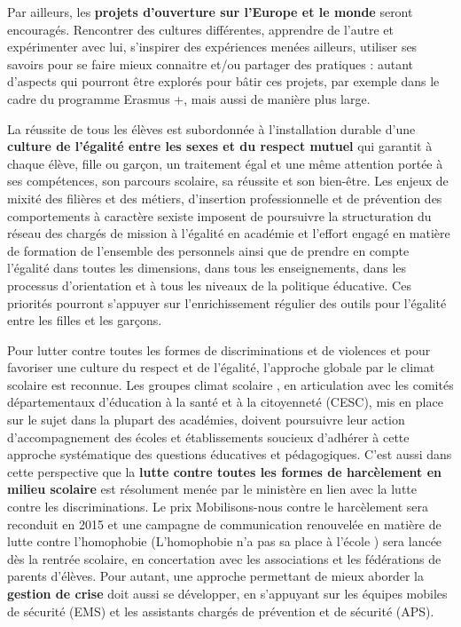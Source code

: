 Par ailleurs, les \textbf{projets d’ouverture sur l’Europe et le monde} seront encouragés. Rencontrer des cultures différentes, apprendre de l’autre et expérimenter avec lui, s’inspirer des expériences menées ailleurs, utiliser ses savoirs pour se faire mieux connaitre et/ou partager des pratiques : autant d’aspects qui pourront être explorés pour bâtir ces projets, par exemple dans le cadre du programme Erasmus +, mais aussi de manière plus large.

La réussite de tous les élèves est subordonnée à l’installation durable d’une \textbf{culture de l’égalité entre les sexes et du respect mutuel} qui garantit à chaque élève, fille ou garçon, un traitement égal et une même attention portée à ses compétences, son parcours scolaire, sa réussite et son bien-être. Les enjeux de mixité des filières et des métiers, d’insertion professionnelle et de prévention des comportements à caractère sexiste imposent de poursuivre la structuration du réseau des chargés de mission à l’égalité en académie et l’effort engagé en matière de formation de l’ensemble des personnels ainsi que de prendre en compte l’égalité dans toutes les dimensions, dans tous les enseignements, dans les processus d’orientation et à tous les niveaux de la politique éducative. Ces priorités pourront s’appuyer sur l’enrichissement régulier des outils pour l’égalité entre les filles et les garçons.

Pour lutter contre toutes les formes de discriminations et de violences et pour favoriser une culture du respect et de l’égalité, l’approche globale par le climat scolaire est reconnue. Les groupes \og climat scolaire \fg{}, en articulation avec les comités départementaux d’éducation à la santé et à la citoyenneté (CESC), mis en place sur le sujet dans la plupart des académies, doivent poursuivre leur action d’accompagnement des écoles et établissements soucieux d’adhérer à cette approche systématique des questions éducatives et pédagogiques. C’est aussi dans cette perspective que la \textbf{lutte contre toutes les formes de harcèlement en milieu scolaire} est résolument menée par le ministère en lien avec la lutte contre les discriminations. Le prix \og Mobilisons-nous contre le harcèlement \fg{} sera reconduit en 2015 et une campagne de communication renouvelée en matière de lutte contre l’homophobie (\og L’homophobie n’a pas sa place à l’école \fg{}) sera lancée dès la rentrée scolaire, en concertation avec les associations et les fédérations de parents d’élèves. Pour autant, une approche permettant de mieux aborder la \textbf{gestion de crise} doit aussi se développer, en s’appuyant sur les équipes mobiles de sécurité (EMS) et les assistants chargés de prévention et de sécurité (APS).

